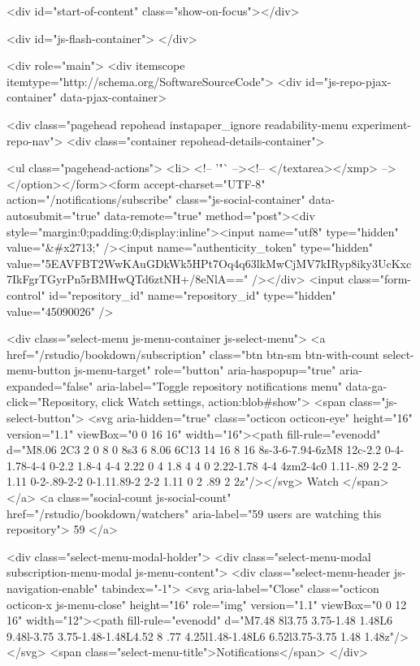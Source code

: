   <div id="start-of-content" class="show-on-focus"></div>

    <div id="js-flash-container">
</div>



  <div role="main">
        <div itemscope itemtype="http://schema.org/SoftwareSourceCode">
    <div id="js-repo-pjax-container" data-pjax-container>
      



  


    <div class="pagehead repohead instapaper_ignore readability-menu experiment-repo-nav">
      <div class="container repohead-details-container">

        <ul class="pagehead-actions">
  <li>
        <!-- '"` --><!-- </textarea></xmp> --></option></form><form accept-charset="UTF-8" action="/notifications/subscribe" class="js-social-container" data-autosubmit="true" data-remote="true" method="post"><div style="margin:0;padding:0;display:inline"><input name="utf8" type="hidden" value="&#x2713;" /><input name="authenticity_token" type="hidden" value="5EAVFBT2WwKAuGDkWk5HPt7Oq4q63lkMwCjMV7kIRyp8iky3UcKxc7IkFgrTGyrPn5rBMHwQTd6ztNH+/8eNlA==" /></div>      <input class="form-control" id="repository_id" name="repository_id" type="hidden" value="45090026" />

        <div class="select-menu js-menu-container js-select-menu">
          <a href="/rstudio/bookdown/subscription"
            class="btn btn-sm btn-with-count select-menu-button js-menu-target"
            role="button"
            aria-haspopup="true"
            aria-expanded="false"
            aria-label="Toggle repository notifications menu"
            data-ga-click="Repository, click Watch settings, action:blob#show">
            <span class="js-select-button">
                <svg aria-hidden="true" class="octicon octicon-eye" height="16" version="1.1" viewBox="0 0 16 16" width="16"><path fill-rule="evenodd" d="M8.06 2C3 2 0 8 0 8s3 6 8.06 6C13 14 16 8 16 8s-3-6-7.94-6zM8 12c-2.2 0-4-1.78-4-4 0-2.2 1.8-4 4-4 2.22 0 4 1.8 4 4 0 2.22-1.78 4-4 4zm2-4c0 1.11-.89 2-2 2-1.11 0-2-.89-2-2 0-1.11.89-2 2-2 1.11 0 2 .89 2 2z"/></svg>
                Watch
            </span>
          </a>
            <a class="social-count js-social-count"
              href="/rstudio/bookdown/watchers"
              aria-label="59 users are watching this repository">
              59
            </a>

        <div class="select-menu-modal-holder">
          <div class="select-menu-modal subscription-menu-modal js-menu-content">
            <div class="select-menu-header js-navigation-enable" tabindex="-1">
              <svg aria-label="Close" class="octicon octicon-x js-menu-close" height="16" role="img" version="1.1" viewBox="0 0 12 16" width="12"><path fill-rule="evenodd" d="M7.48 8l3.75 3.75-1.48 1.48L6 9.48l-3.75 3.75-1.48-1.48L4.52 8 .77 4.25l1.48-1.48L6 6.52l3.75-3.75 1.48 1.48z"/></svg>
              <span class="select-menu-title">Notifications</span>
            </div>

